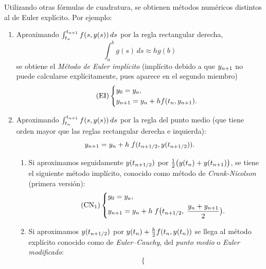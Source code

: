 Utilizando otras fórmulas de cuadratura, se obtienen métodos numéricos
distintos al de Euler explícito. Por ejemplo:
\begin{enumerate}
\item Aproximando $\int_{t_n}^{t_{n+1}} f(s,y(s))\, ds$ por la regla
  rectangular derecha,
  \begin{equation*}
    \int_a^b g(s)\,ds \approx hg(b)
  \end{equation*}
  se obtiene el \textit{Método de Euler implícito} (implícito debido a
  que ${y_{n+1}}$ no puede calcularse explícitamente, pues aparece en el
  segundo miembro)
  \begin{equation}
    \label{eq:euler-implicito}
    \tag{EI}
    \left\{
    \begin{aligned}
      &y_0={y_a},\\ &{y_{n+1}} = {y_n} + h f({t_n},{y_{n+1}}).
    \end{aligned}
    \right.
  \end{equation}
\item Aproximando $\int_{t_n}^{t_{n+1}} f(s,y(s))\, ds$ por la regla del
  punto medio (que tiene orden mayor que las reglas rectangular
  derecha e izquierda):
  \begin{equation*}
    {y_{n+1}} = {y_n} + h \; f(t_{n+1/2},y(t_{n+1/2})).
  \end{equation*}
  \begin{enumerate}
  \item Si aproximamos seguidamente $y(t_{n+1/2})$ por
    $\frac12\big(y({t_n})+y({t_{n+1}})\big)$, se tiene el siguiente
    método implícito, conocido como método de \textit{Crank-Nicolson}
    (primera versión):
    \begin{equation}
    \label{eq:crank-nicolson-1}
      \tag{CN$_1$}
      \left\{
        \begin{aligned}
          &y_0={y_a},\\ 
          &{y_{n+1}} = {y_n} + h \; f\big(t_{n+1/2},\; \frac{{y_n}+{y_{n+1}}}{2}\big).
        \end{aligned}
      \right.
    \end{equation}
  \item Si aproximamos $y(t_{n+1/2})$ por
    $y({t_n})+\frac{h}{2}f({t_n},y({t_n}))$ se llega al método
    explícito conocido como de \textit{Euler--Cauchy}, del
    \textit{punto medio} o \textit{Euler modificado}:
    \begin{equation}
      \label{eq:euler-cauchy}
      \tag{EC}
      \left\{
        \begin{aligned}

\end{aligned}
\end{equation}
\end{enumerate}
\end{enumerate}
